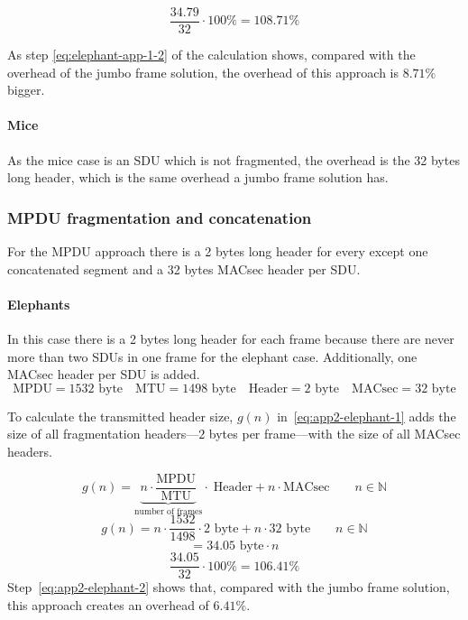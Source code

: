 \begin{equation}\label{eq:elephant-app-1-2}
  \frac{34.79}{32} \cdot 100\% = 108.71\%
\end{equation}

As step \ref{eq:elephant-app-1-2} of the calculation shows, compared with the overhead of the jumbo frame solution, the overhead of this approach is $8.71\%$ bigger.

\paragraph{Mice}
As the mice case is an \gls{SDU} which is not fragmented, the overhead is the 32 bytes long header, which is the same overhead a jumbo frame solution has.

\subsubsection{\gls{MPDU} fragmentation and concatenation}
For the \gls{MPDU} approach there is a 2 bytes long header for every except one concatenated segment and a 32 bytes \gls{MACsec} header per \gls{SDU}.

\paragraph{Elephants}
In this case there is a 2 bytes long header for each frame because there are never more than two \glspl{SDU} in one frame for the elephant case.
Additionally, one \gls{MACsec} header per \gls{SDU} is added.
\begin{equation*}
  \text{MPDU} = 1532\text{ byte}
  \quad   \text{MTU} = 1498\text{ byte}
  \quad   \text{Header} = 2\text{ byte}
  \quad   \text{MACsec} = 32\text{ byte}
\end{equation*}

To calculate the transmitted header size, $g(n)$ in~\ref{eq:app2-elephant-1} adds the size of all fragmentation headers---$2$ bytes per frame---with the size of all \gls{MACsec} headers.

\begin{equation}\label{eq:app2-elephant-1}
  g(n) = \underbrace{n \cdot \frac{\text{MPDU}}{\text{MTU}}}_{\text{number of frames}} \cdot\; \text{Header} + n \cdot \text{MACsec} \qquad n \in \mathbb{N}
\end{equation}
\begin{equation}
  g(n) = n \cdot \frac{1532}{1498} \cdot 2 \text{ byte} + n \cdot 32\text{ byte} \qquad n \in \mathbb{N}
\end{equation}
\begin{equation}
  = 34.05\text{ byte}\cdot n
\end{equation}
\begin{equation}\label{eq:app2-elephant-2}
  \frac{34.05}{32} \cdot 100\% = 106.41\%
\end{equation}
Step~\ref{eq:app2-elephant-2} shows that, compared with the jumbo frame solution, this approach creates an overhead of $6.41\%$.

